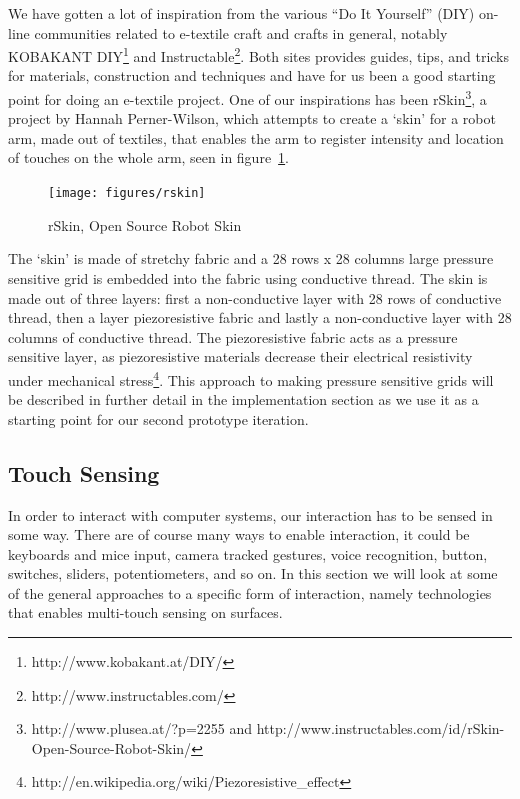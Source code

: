 We have gotten a lot of inspiration from the various ``Do It Yourself'' (DIY) on-line communities related to e-textile craft and crafts in general, notably KOBAKANT DIY\footnote{http://www.kobakant.at/DIY/} and Instructable\footnote{http://www.instructables.com/}.
Both sites provides guides, tips, and tricks for materials, construction and techniques and have for us been a good starting point for doing an e-textile project.
One of our inspirations has been rSkin\footnote{http://www.plusea.at/?p=2255 and http://www.instructables.com/id/rSkin-Open-Source-Robot-Skin/}, a project by Hannah Perner-Wilson, which attempts to create a `skin' for a robot arm, made out of textiles, that enables the arm to register intensity and location of touches on the whole arm, seen in figure~\ref{rskin}.

\begin{figure}[h]
  \centering
  \begin{minipage}[b]{.8\textwidth}
    \centering
    \texttt{[image: figures/rskin]}
  	\caption{rSkin, Open Source Robot Skin}
    \label{rskin}
    \end{minipage}
\end{figure}

The `skin' is made of stretchy fabric and a 28 rows x 28 columns large pressure sensitive grid is embedded into the fabric using conductive thread.
The skin is made out of three layers: first a non-conductive layer with 28 rows of conductive thread, then a layer piezoresistive fabric and lastly a non-conductive layer with 28 columns of conductive thread.
The piezoresistive fabric acts as a pressure sensitive layer, as piezoresistive materials decrease their electrical resistivity under mechanical stress\footnote{http://en.wikipedia.org/wiki/Piezoresistive\_effect}.
This approach to making pressure sensitive grids will be described in further detail in the implementation section as we use it as a starting point for our second prototype iteration.

\subsection{Touch Sensing}
\label{ch:textiletouch:related:touch}
In order to interact with computer systems, our interaction has to be sensed in some way.
There are of course many ways to enable interaction, it could be keyboards and mice input, camera tracked gestures, voice recognition, button, switches, sliders, potentiometers, and so on.
In this section we will look at some of the general approaches to a specific form of interaction, namely technologies that enables multi-touch sensing on surfaces.

